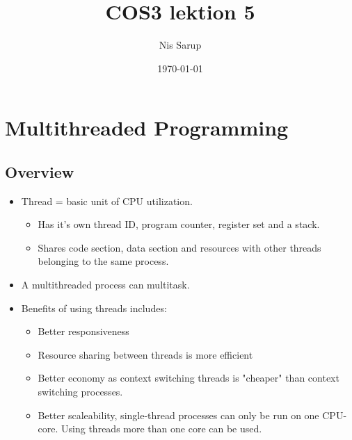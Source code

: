\documentclass[a4wide,10pt]{article}
\begin{document}
\title{COS3 lektion 5}
\author{Nis Sarup}
\date{\today}
\maketitle


\addtocounter{section}{3}
\section{Multithreaded Programming} %
\label{sec:multithreaded_programming}
\subsection{Overview} %
\label{sub:overview}
\begin{itemize}
	\item Thread = basic unit of CPU utilization.
	\begin{itemize}
		\item Has it's own thread ID, program counter, register set and a stack.
		\item Shares code section, data section and resources with other threads belonging to the same process.
	\end{itemize}
	\item A multithreaded process can multitask.
	\item Benefits of using threads includes:
	\begin{itemize}
		\item Better responsiveness
		\item Resource sharing between threads is more efficient
		\item Better economy as context switching threads is "cheaper" than context switching processes.
		\item Better scaleability, single-thread processes can only be run on one CPU-core. Using threads more than one core can be used.
	\end{itemize}
\end{itemize}
\end{document}
